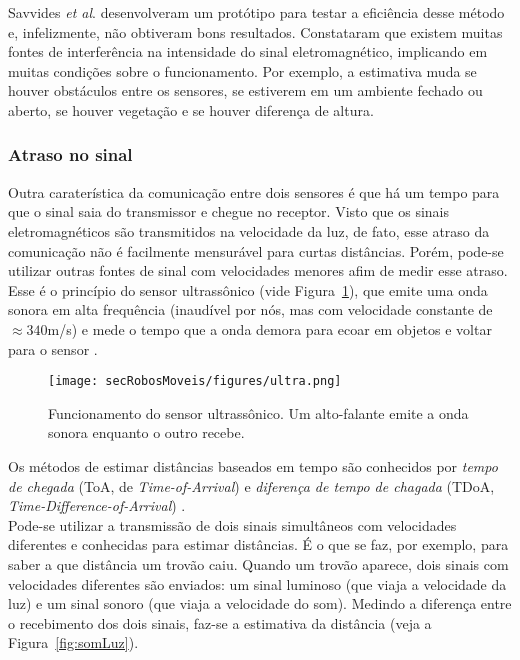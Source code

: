Savvides \textit{et al}. \cite{savvides2001dynamic} desenvolveram um protótipo para testar a eficiência desse método e, infelizmente, não obtiveram bons resultados. Constataram que existem muitas fontes de interferência na intensidade do sinal eletromagnético, implicando em muitas condições sobre o funcionamento. Por exemplo, a estimativa muda se houver obstáculos entre os sensores, se estiverem em um ambiente fechado ou aberto, se houver vegetação e se houver diferença de altura.

\subsubsection{Atraso no sinal}

Outra caraterística da comunicação entre dois sensores é que há um tempo para que o sinal saia do transmissor e chegue no receptor. Visto que os sinais eletromagnéticos são transmitidos na velocidade da luz, de fato, esse atraso da comunicação não é facilmente mensurável para curtas distâncias. Porém, pode-se utilizar outras fontes de sinal com velocidades menores afim de medir esse atraso. Esse é o princípio do sensor ultrassônico (vide Figura~\ref{fig:ultrasonico}), que emite uma onda sonora em alta frequência (inaudível por nós, mas com velocidade constante de $\approx 340$m/s) e mede o tempo que a onda demora para ecoar em objetos e voltar para o sensor \cite{sensorsForMobileRobots}.

\begin{figure}[H]
	\begin{center}
		\texttt{[image: secRobosMoveis/figures/ultra.png]}
	\end{center}
	\caption{Funcionamento do sensor ultrassônico. Um alto-falante emite a onda sonora enquanto o outro recebe.}
	\label{fig:ultrasonico}
\end{figure}

Os métodos de estimar distâncias baseados em tempo são conhecidos por \textit{tempo de chegada} (ToA, de \textit{Time-of-Arrival}) e \textit{diferença de tempo de chagada} (TDoA, \textit{Time-Difference-of-Arrival}) \cite{savvides2001dynamic}. 
\\

Pode-se utilizar a transmissão de dois sinais simultâneos com velocidades diferentes e conhecidas para estimar distâncias. É o que se faz, por exemplo, para saber a que distância um trovão caiu. Quando um trovão aparece, dois sinais com velocidades diferentes são enviados: um sinal luminoso (que viaja a velocidade da luz) e um sinal sonoro (que viaja a velocidade do som).
Medindo a diferença entre o recebimento dos dois sinais, faz-se a estimativa da distância (veja a Figura~\ref{fig:somLuz}).

